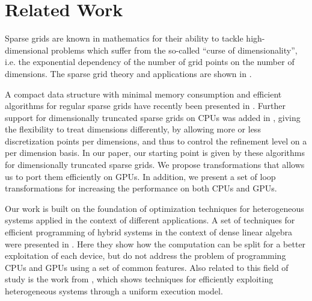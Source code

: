 \section{Related Work}
\label{sec:related_work}
Sparse grids are known in mathematics for their ability to tackle
high-dimensional problems which suffer from the so-called ``curse of
dimensionality'', i.e. the exponential dependency of the number of grid points
on the number of dimensions. The sparse grid theory and applications are shown
in \cite{CambridgeJournals:227245}.

A compact data structure with minimal memory consumption and efficient
algorithms for regular sparse grids have recently been presented in
\cite{Murarasu:2011:CDS:1941553.1941559}. Further support for dimensionally
truncated sparse grids on CPUs was added in \cite{murarasu12fastsg:}, giving the
flexibility to treat dimensions differently, by allowing more or less
discretization points per dimensions, and thus to control the refinement level
on a per dimension basis. In our paper, our starting point is given by these
algorithms for dimensionally truncated sparse grids. We propose transformations
that allows us to port them efficiently on GPUs. In addition, we present a set
of loop transformations for increasing the performance on both CPUs and GPUs.

Our work is built on the foundation of optimization techniques for heterogeneous systems
applied in the context of different applications. A set of techniques for
efficient programming of hybrid systems in the context of dense linear algebra
were presented in \cite{Tomov:2010:TDL:1805333.1805388}.
Here they show how the computation can be split for a better exploitation of
each device, but do not address the problem of programming CPUs and GPUs using a
set of common features. Also related to this field of study is the work from
\cite{Augonnet:2011:SUP:1951453.1951454}, which shows techniques for efficiently
exploiting heterogeneous systems through a uniform execution model.

